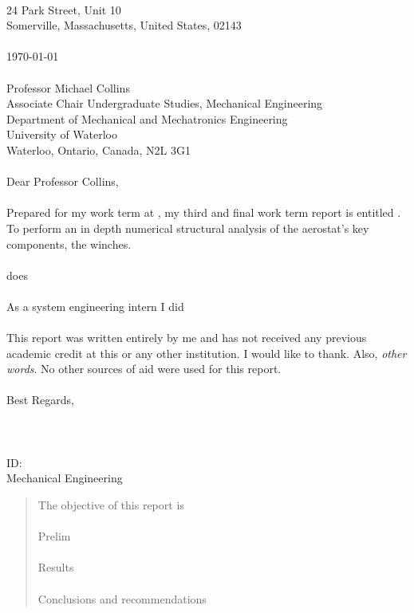 \begin{declaration}
    \noindent
	\Company\\
	24 Park Street, Unit 10\\
	Somerville, Massachusetts, United States, 02143\\
	\\  
    \noindent  	
    \today \\
  	\\  
    \noindent
    Professor Michael Collins\\
	Associate Chair Undergraduate Studies, Mechanical Engineering\\
	Department of Mechanical and Mechatronics Engineering\\
	University of Waterloo\\
	Waterloo, Ontario, Canada, N2L 3G1\\	\\
    \noindent
    Dear Professor Collins,\\ \\
	\noindent
    Prepared for my \Term work term at , my third and final work term report is
	entitled \textbf{\emph{\ReportTitle}}. To perform an in depth numerical structural analysis of the aerostat's key components, the winches.\\ \\
	\noindent	
	\Company  does\\\\
	\noindent
	As a system engineering intern I did\\ \\
	\noindent
	This report was written entirely by me and has not received any previous academic credit at this or
	any other institution. I would like to thank. Also, \emph{other words}. No other sources of aid were used for this report.\\ \\
	\noindent
	Best Regards,\\
	\\
	\\
	\noindent
	\Seb\\
	ID: \\
	\Term Mechanical Engineering\\
	
	\thispagestyle{empty}
	
\end{declaration}

\begin{abstract}

	\noindent
	The objective of this report is \\ \\
	Prelim\\ \\
	Results\\ \\
	Conclusions and recommendations\\

\end{abstract}

